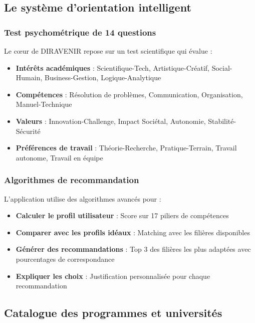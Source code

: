 \documentclass[12pt,a4paper]{report}
\begin{document}
\subsection{Le système d'orientation intelligent}

\subsubsection{Test psychométrique de 14 questions}

Le cœur de DIRAVENIR repose sur un test scientifique qui évalue :

\begin{itemize}
    \item \textbf{Intérêts académiques} : Scientifique-Tech, Artistique-Créatif, Social-Humain, Business-Gestion, Logique-Analytique
    \item \textbf{Compétences} : Résolution de problèmes, Communication, Organisation, Manuel-Technique
    \item \textbf{Valeurs} : Innovation-Challenge, Impact Sociétal, Autonomie, Stabilité-Sécurité
    \item \textbf{Préférences de travail} : Théorie-Recherche, Pratique-Terrain, Travail autonome, Travail en équipe
\end{itemize}

\subsubsection{Algorithmes de recommandation}

L'application utilise des algorithmes avancés pour :

\begin{itemize}
    \item \textbf{Calculer le profil utilisateur} : Score sur 17 piliers de compétences
    \item \textbf{Comparer avec les profils idéaux} : Matching avec les filières disponibles
    \item \textbf{Générer des recommandations} : Top 3 des filières les plus adaptées avec pourcentages de correspondance
    \item \textbf{Expliquer les choix} : Justification personnalisée pour chaque recommandation
\end{itemize}

\subsection{Catalogue des programmes et universités}
\end{document}
